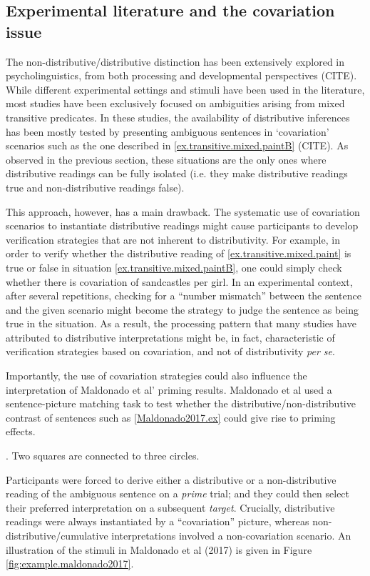\documentclass[a4paper, 11pt]{article}
\newcommand{\addMM}[1]{{\leavevmode\color{red}#1}}
\begin{document}
\subsection{Experimental literature and the covariation issue}
The non-distributive/distributive distinction has been extensively explored in psycholinguistics, from both processing and developmental perspectives (CITE). 
While different experimental settings and stimuli have been used in the literature, most studies have been exclusively focused on ambiguities arising from mixed transitive predicates. 
In these studies, the availability of distributive inferences has been mostly tested by presenting ambiguous sentences in `covariation' scenarios such as the one described in \ref{ex.transitive.mixed.paintB} (CITE). 
\addMM{As observed in the previous section, these situations are the only ones where distributive readings can be fully isolated (i.e. they make distributive readings true and non-distributive readings false).}

This approach, however, has a main drawback. The systematic use of covariation scenarios to instantiate distributive readings might cause participants to develop verification strategies that are not inherent to distributivity. 
For example, in order to verify whether the distributive reading of \ref{ex.transitive.mixed.paint} is true or false in situation \ref{ex.transitive.mixed.paintB}, one could simply check whether there is covariation of sandcastles per girl. 
In an experimental context, after several repetitions, checking for a ``number mismatch'' between the sentence and the given scenario might become the strategy to judge the sentence as being true in the situation. 
As a result, the processing pattern that many studies have attributed to distributive interpretations might be, in fact, characteristic of verification strategies based on covariation, and not of distributivity \textit{per se}. 

Importantly, the use of covariation strategies could also influence the interpretation of Maldonado et al' priming results. 
Maldonado et al used a sentence-picture matching task to test whether the distributive/non-distributive contrast of sentences such as \ref{Maldonado2017.ex} could give rise to priming effects. 

\ex. Two squares are connected to three circles. \label{Maldonado2017.ex}

%
Participants were forced to derive either a distributive or a non-distributive reading of the ambiguous sentence on a \emph{prime} trial; and they could then select their preferred interpretation on a subsequent \emph{target}. 
%
Crucially, distributive readings were always instantiated by a ``covariation'' picture, whereas non-distributive/cumulative interpretations involved a non-covariation scenario.  An illustration of the stimuli in Maldonado et al (2017) is given in Figure \ref{fig:example.maldonado2017}. 
\end{document}
